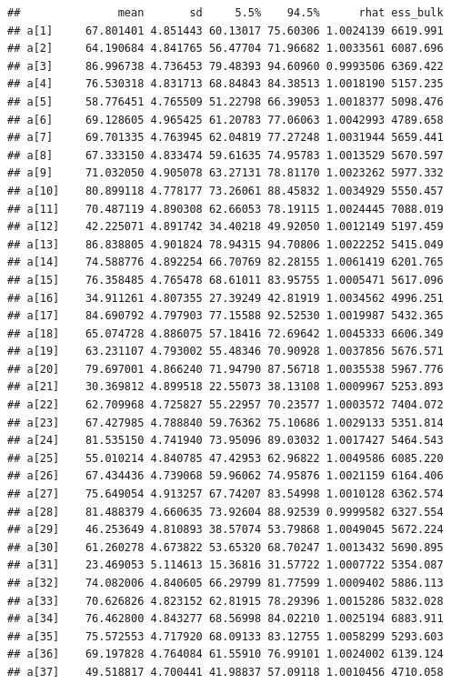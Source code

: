 \documentclass[
]{book}
\begin{document}
\begin{verbatim}
##               mean       sd     5.5%    94.5%      rhat ess_bulk
## a[1]     67.801401 4.851443 60.13017 75.60306 1.0024139 6619.991
## a[2]     64.190684 4.841765 56.47704 71.96682 1.0033561 6087.696
## a[3]     86.996738 4.736453 79.48393 94.60960 0.9993506 6369.422
## a[4]     76.530318 4.831713 68.84843 84.38513 1.0018190 5157.235
## a[5]     58.776451 4.765509 51.22798 66.39053 1.0018377 5098.476
## a[6]     69.128605 4.965425 61.20783 77.06063 1.0042993 4789.658
## a[7]     69.701335 4.763945 62.04819 77.27248 1.0031944 5659.441
## a[8]     67.333150 4.833474 59.61635 74.95783 1.0013529 5670.597
## a[9]     71.032050 4.905078 63.27131 78.81170 1.0023262 5977.332
## a[10]    80.899118 4.778177 73.26061 88.45832 1.0034929 5550.457
## a[11]    70.487119 4.890308 62.66053 78.19115 1.0024445 7088.019
## a[12]    42.225071 4.891742 34.40218 49.92050 1.0012149 5197.459
## a[13]    86.838805 4.901824 78.94315 94.70806 1.0022252 5415.049
## a[14]    74.588776 4.892254 66.70769 82.28155 1.0061419 6201.765
## a[15]    76.358485 4.765478 68.61011 83.95755 1.0005471 5617.096
## a[16]    34.911261 4.807355 27.39249 42.81919 1.0034562 4996.251
## a[17]    84.690792 4.797903 77.15588 92.52530 1.0019987 5432.365
## a[18]    65.074728 4.886075 57.18416 72.69642 1.0045333 6606.349
## a[19]    63.231107 4.793002 55.48346 70.90928 1.0037856 5676.571
## a[20]    79.697001 4.866240 71.94790 87.56718 1.0035538 5967.776
## a[21]    30.369812 4.899518 22.55073 38.13108 1.0009967 5253.893
## a[22]    62.709968 4.725827 55.22957 70.23577 1.0003572 7404.072
## a[23]    67.427985 4.788840 59.76362 75.10686 1.0029133 5351.814
## a[24]    81.535150 4.741940 73.95096 89.03032 1.0017427 5464.543
## a[25]    55.010214 4.840785 47.42953 62.96822 1.0049586 6085.220
## a[26]    67.434436 4.739068 59.96062 74.95876 1.0021159 6164.406
## a[27]    75.649054 4.913257 67.74207 83.54998 1.0010128 6362.574
## a[28]    81.488379 4.660635 73.92604 88.92539 0.9999582 6327.554
## a[29]    46.253649 4.810893 38.57074 53.79868 1.0049045 5672.224
## a[30]    61.260278 4.673822 53.65320 68.70247 1.0013432 5690.895
## a[31]    23.469053 5.114613 15.36816 31.57722 1.0007722 5354.087
## a[32]    74.082006 4.840605 66.29799 81.77599 1.0009402 5886.113
## a[33]    70.626826 4.823152 62.81915 78.29396 1.0015286 5832.028
## a[34]    76.462800 4.843277 68.56998 84.02210 1.0025194 6883.911
## a[35]    75.572553 4.717920 68.09133 83.12755 1.0058299 5293.603
## a[36]    69.197828 4.764084 61.55910 76.99101 1.0024002 6139.124
## a[37]    49.518817 4.700441 41.98837 57.09118 1.0010456 4710.058

\end{verbatim}
\end{document}

